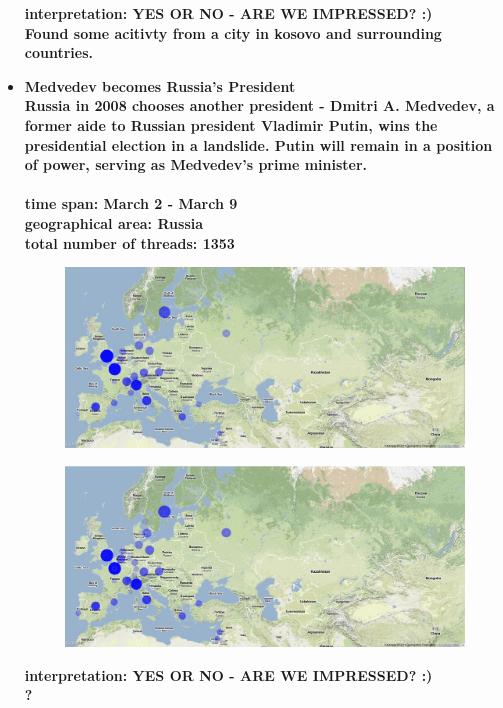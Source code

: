 \documentclass[11pt,a4paper,english]{article}
\begin{document}
\begin{itemize}
\begin{figure}[H]
\begin{center}
							\end{center}
							\vspace{-13pt}
						\end{figure}	
						\bf interpretation: \rm YES OR NO - ARE WE IMPRESSED? :)
						\\ Found some acitivty from a city in kosovo and surrounding countries.
						
						
						
					\item \bf Medvedev becomes Russia's President \rm
						\\ Russia in 2008 chooses another president - Dmitri A. Medvedev, a former aide to Russian president Vladimir Putin, wins the presidential election in a landslide. Putin will remain in a position of power, serving as Medvedev's prime minister.
						\\\\ \bf time span: \rm March 2 - March 9
						\\ \bf geographical area: \rm Russia
						\\ \bf total number of threads: \rm 1353
						\begin{figure}[H]
							\vspace{-13pt}
  							\begin{center}
								\includegraphics[width=130mm]{img/pre-medvev}		
							\end{center}
							\vspace{-13pt}
						\end{figure}
						\begin{figure}[H]
							\vspace{-13pt}
	  						\begin{center}
								\includegraphics[width=130mm]{img/post-medvev}
							\end{center}
							\vspace{-13pt}
						\end{figure}	
						\bf interpretation: \rm YES OR NO - ARE WE IMPRESSED? :)
						\\ ?


\end{itemize}
\end{document}

